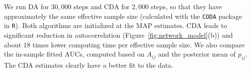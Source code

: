\documentclass[twoside,11pt]{article}
\newcommand{\be}{\begin{equs}}
\newcommand{\ee}{\end{equs}}
\newcommand{\Binom}{\text{Binomial}}
\newcommand{\No}{\text{No}}
\newcommand{\PG}{\text{PG}}
\newcommand{\1}{\mathbf 1}
\begin{document}
{We run DA for $30,000$ steps and CDA for $2,000$ steps, so that they have approximately the same effective sample size (calculated with the \texttt{CODA} package in \texttt{R}). Both algorithms are initialized at the MAP estimates. CDA leads to significant reduction in autocorrelation (Figure~\ref{fig:network_model}(b)) and about $18$ times lower computing time per effective sample size. We also compare the {in-sample} fitted AUCs, computed based on $A_{ij}$ and the posterior mean of $p_{ij}$. The CDA estimates clearly have a better fit to the data.

%
%
}
\end{document}
